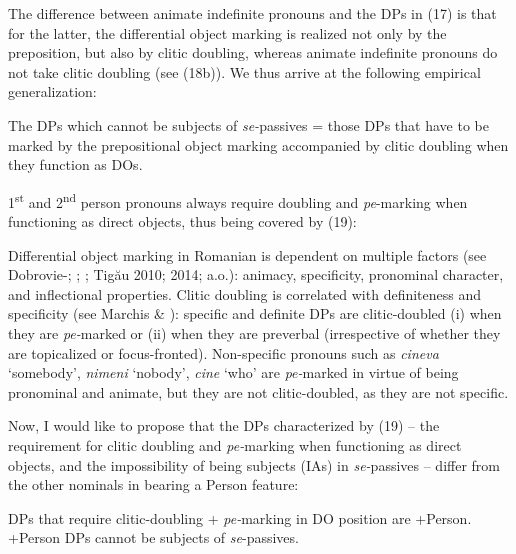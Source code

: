 \documentclass[output=paper]{langsci/langscibook}
\begin{document}
The difference between animate indefinite pronouns and the DPs in (17) is that for the latter, the differential object marking is realized not only by the preposition, but also by clitic doubling, whereas animate indefinite pronouns do not take clitic doubling (see (18b)). We thus arrive at the following empirical generalization:

\ea%
    \label{ex:giurgea:19}
    The DPs which cannot be subjects of \textit{se-}passives = those DPs that have to be marked by the prepositional object marking accompanied by clitic doubling when they function as DOs.
\z

1\textsuperscript{st} and 2\textsuperscript{nd} person pronouns always require doubling and \textit{pe}{}-marking when functioning as direct objects, thus being covered by (19):

\ea%
    \label{ex:giurgea:20}
    \z
\z

Differential object marking in Romanian is dependent on multiple factors (see Dobrovie-\citealt{Sorin1994}; \citealt{Cornilescu2000}; \citealt{Mardale2008}; Tigău 2010; 2014; a.o.): animacy, specificity, pronominal character, and inflectional properties. Clitic doubling is correlated with definiteness and specificity (see Marchis \& \citealt{Alexiadou2013}): specific and definite DPs are clitic-doubled (i) when they are \textit{pe-}marked or (ii) when they are preverbal (irrespective of whether they are topicalized or focus-fronted). Non-specific pronouns such as \textit{cineva} ‘somebody’, \textit{nimeni} ‘nobody’, \textit{cine} ‘who’ are \textit{pe-}marked in virtue of being pronominal and animate, but they are not clitic-doubled, as they are not specific.

Now, I would like to propose that the DPs characterized by (19) – the requirement for clitic doubling and \textit{pe-}marking when functioning as direct objects, and the impossibility of being subjects (IAs) in \textit{se-}passives – differ from the other nominals in bearing a Person feature:

\ea%
    \label{ex:giurgea:21}
    \ea DPs that require clitic-doubling + \textit{pe-}marking in DO position are +Person.
      \ex +Person DPs cannot be subjects of \textit{se}{}-passives.
    \z
\z
\end{document}
